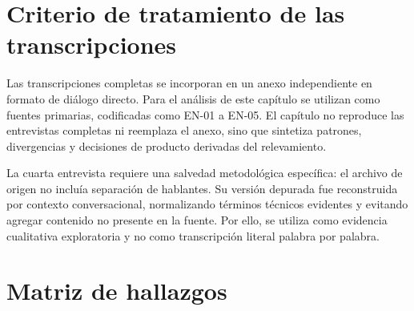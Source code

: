 \section{Criterio de tratamiento de las transcripciones}

Las transcripciones completas se incorporan en un anexo independiente en formato de diálogo directo. Para el análisis de este capítulo se utilizan como fuentes primarias, codificadas como EN-01 a EN-05. El capítulo no reproduce las entrevistas completas ni reemplaza el anexo, sino que sintetiza patrones, divergencias y decisiones de producto derivadas del relevamiento.

La cuarta entrevista requiere una salvedad metodológica específica: el archivo de origen no incluía separación de hablantes. Su versión depurada fue reconstruida por contexto conversacional, normalizando términos técnicos evidentes y evitando agregar contenido no presente en la fuente. Por ello, se utiliza como evidencia cualitativa exploratoria y no como transcripción literal palabra por palabra.

\section{Matriz de hallazgos}

